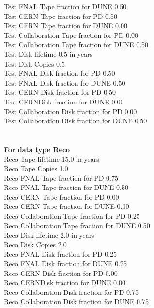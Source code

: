 \documentclass[12pt]{article}
\begin{document}
  Test FNAL Tape fraction for DUNE  0.50\\
  Test CERN Tape fraction for PD  0.50\\
  Test CERN Tape fraction for DUNE  0.00\\
  Test Collaboration Tape fraction for PD  0.00\\
  Test Collaboration Tape fraction for DUNE  0.50\\
  Test Disk lifetime   0.5 in years\\
  Test Disk Copies   0.5\\
  Test FNAL Disk fraction for PD  0.50\\
  Test FNAL Disk fraction for DUNE  0.50\\
  Test CERN Disk fraction for PD  0.50\\
  Test CERNDisk fraction for DUNE  0.00\\
  Test Collaboration Disk fraction for PD  0.00\\
  Test Collaboration Disk fraction for DUNE  0.50\\
\pagebreak\\
\\
{\bf For data type Reco}\\
  Reco Tape lifetime  15.0 in years\\
  Reco Tape Copies   1.0\\
  Reco FNAL Tape fraction for PD  0.75\\
  Reco FNAL Tape fraction for DUNE  0.50\\
  Reco CERN Tape fraction for PD  0.00\\
  Reco CERN Tape fraction for DUNE  0.00\\
  Reco Collaboration Tape fraction for PD  0.25\\
  Reco Collaboration Tape fraction for DUNE  0.50\\
  Reco Disk lifetime   2.0 in years\\
  Reco Disk Copies   2.0\\
  Reco FNAL Disk fraction for PD  0.25\\
  Reco FNAL Disk fraction for DUNE  0.25\\
  Reco CERN Disk fraction for PD  0.00\\
  Reco CERNDisk fraction for DUNE  0.00\\
  Reco Collaboration Disk fraction for PD  0.75\\
  Reco Collaboration Disk fraction for DUNE  0.75\\
\pagebreak\\
\end{document}
